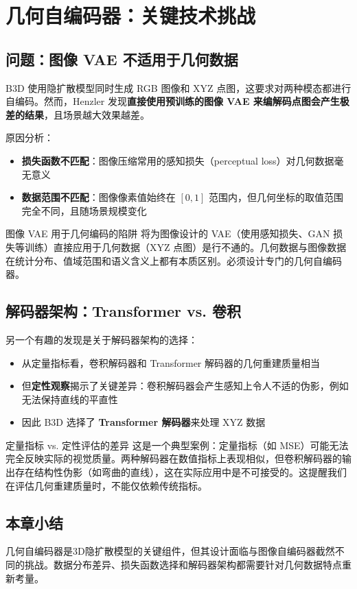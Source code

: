 \section{几何自编码器：关键技术挑战}

\subsection{问题：图像 VAE 不适用于几何数据}

B3D 使用隐扩散模型同时生成 RGB 图像和 XYZ 点图，这要求对两种模态都进行自编码。然而，Henzler 发现\textbf{直接使用预训练的图像 VAE 来编解码点图会产生极差的结果}，且场景越大效果越差。

原因分析：
\begin{itemize}
    \item \textbf{损失函数不匹配}：图像压缩常用的感知损失（perceptual loss）对几何数据毫无意义
    \item \textbf{数据范围不匹配}：图像像素值始终在 $[0, 1]$ 范围内，但几何坐标的取值范围完全不同，且随场景规模变化
\end{itemize}

\begin{warningbox}{图像 VAE 用于几何编码的陷阱}
将为图像设计的 VAE（使用感知损失、GAN 损失等训练）直接应用于几何数据（XYZ 点图）是行不通的。几何数据与图像数据在统计分布、值域范围和语义含义上都有本质区别。必须设计专门的几何自编码器。
\end{warningbox}

\subsection{解码器架构：Transformer vs. 卷积}

另一个有趣的发现是关于解码器架构的选择：

\begin{itemize}
    \item 从定量指标看，卷积解码器和 Transformer 解码器的几何重建质量相当
    \item 但\textbf{定性观察}揭示了关键差异：卷积解码器会产生感知上令人不适的伪影，例如无法保持直线的平直性
    \item 因此 B3D 选择了 \textbf{Transformer 解码器}来处理 XYZ 数据
\end{itemize}

\begin{warningbox}{定量指标 vs. 定性评估的差异}
这是一个典型案例：定量指标（如 MSE）可能无法完全反映实际的视觉质量。两种解码器在数值指标上表现相似，但卷积解码器的输出存在结构性伪影（如弯曲的直线），这在实际应用中是不可接受的。这提醒我们在评估几何重建质量时，不能仅依赖传统指标。
\end{warningbox}

\subsection{本章小结}

几何自编码器是3D隐扩散模型的关键组件，但其设计面临与图像自编码器截然不同的挑战。数据分布差异、损失函数选择和解码器架构都需要针对几何数据特点重新考量。

